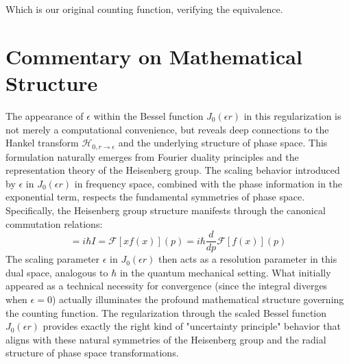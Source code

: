 \documentclass{article}
\begin{document}
Which is our original counting function, verifying the equivalence.

\section*{Commentary on Mathematical Structure}
The appearance of $\epsilon$ within the Bessel function $J_0(\epsilon r)$ in this regularization is not merely a computational convenience, but reveals deep connections to the Hankel transform $\mathcal{H}_{0,r\to\epsilon}$ and the underlying structure of phase space. This formulation naturally emerges from Fourier duality principles and the representation theory of the Heisenberg group. The scaling behavior introduced by $\epsilon$ in $J_0(\epsilon r)$ in frequency space, combined with the phase information in the exponential term, respects the fundamental symmetries of phase space. Specifically, the Heisenberg group structure manifests through the canonical commutation relations:
\begin{equation}
    [X,P] = i\hbar I = \mathcal{F}[xf(x)](p) = i\hbar\frac{d}{dp}\mathcal{F}[f(x)](p)
\end{equation}
The scaling parameter $\epsilon$ in $J_0(\epsilon r)$ then acts as a resolution parameter in this dual space, analogous to $\hbar$ in the quantum mechanical setting. What initially appeared as a technical necessity for convergence (since the integral diverges when $\epsilon = 0$) actually illuminates the profound mathematical structure governing the counting function. The regularization through the scaled Bessel function $J_0(\epsilon r)$ provides exactly the right kind of "uncertainty principle" behavior that aligns with these natural symmetries of the Heisenberg group and the radial structure of phase space transformations.
\end{document}
